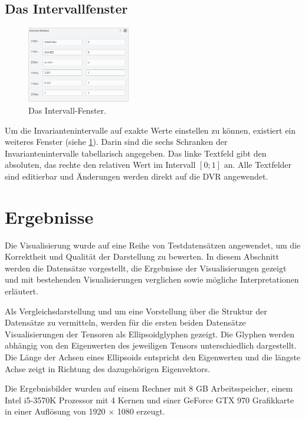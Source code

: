 \documentclass[a4paper,fontsize=12pt,toc=bib,parskip=half,ngerman]{scrartcl}
\begin{document}
\subsection{Das Intervallfenster}
\begin{figure}
	\centering
	\includegraphics[width=0.4\textwidth]{pictures/IntervalWindow.png}
	\caption{Das Intervall-Fenster.}
	\label{IntervalWindow}
\end{figure}
Um die Invariantenintervalle auf exakte Werte einstellen zu k\"onnen, existiert ein weiteres Fenster (siehe \cref{IntervalWindow}). Darin sind die sechs Schranken der Invariantenintervalle tabellarisch angegeben. Das linke Textfeld gibt den absoluten, das rechte den relativen Wert im Intervall $[0;1]$ an. Alle Textfelder sind editierbar und \"Anderungen werden direkt auf die DVR angewendet.

\section{Ergebnisse}
\label{sec:Ergebnisse}
Die Visualisierung wurde auf eine Reihe von Testdatens\"atzen angewendet, um die Korrektheit und Qualit\"at der Darstellung zu bewerten. In diesem Abschnitt werden die Datens\"atze vorgestellt, die Ergebnisse der Visualisierungen gezeigt und mit bestehenden Visualisierungen verglichen sowie m\"ogliche Interpretationen erl\"autert.

Als Vergleichsdarstellung und um eine Vorstellung \"uber die Struktur der Datens\"atze zu vermitteln, werden f\"ur die ersten beiden Datens\"atze Visualisierungen der Tensoren als Ellipsoidglyphen gezeigt. Die Glyphen werden abh\"angig von den Eigenwerten des jeweiligen Tensors unterschiedlich dargestellt. Die L\"ange der Achsen eines Ellipsoids entspricht den Eigenwerten und die l\"angste Achse zeigt in Richtung des dazugeh\"origen Eigenvektors.

Die Ergebnisbilder wurden auf einem Rechner mit 8 GB Arbeitsspeicher, einem Intel i5-3570K Prozessor mit 4 Kernen und einer GeForce GTX 970 Grafikkarte in einer Aufl\"osung von 1920 $\times$ 1080 erzeugt.
\end{document}
